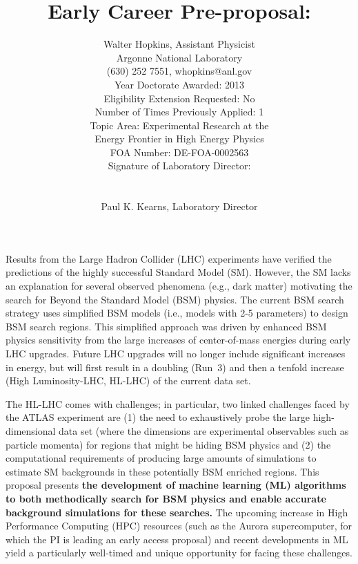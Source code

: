 \documentclass[letter, USenglish, 11pt, subfigure]{article}
\title{Early Career Pre-proposal: \\}
\author{Walter Hopkins, Assistant Physicist\\Argonne National Laboratory\\(630) 252 7551, whopkins@anl.gov\\Year Doctorate Awarded: 2013\\Eligibility Extension Requested: No\\Number of Times Previously Applied: 1\\ Topic Area: Experimental Research at the \\Energy Frontier in High Energy Physics\\
  FOA Number: DE-FOA-0002563\\Signature of Laboratory Director: \\ \\ \\Paul K. Kearns, Laboratory Director
}
\date{}
\begin{document}
\maketitle

Results from the Large Hadron Collider (LHC) experiments have verified the predictions of the highly successful Standard Model (SM). However, the SM  lacks an explanation for several observed phenomena (e.g., dark matter) motivating the search for Beyond the Standard Model (BSM) physics. The current BSM search strategy uses simplified BSM models (i.e., models with 2-5 parameters) to design BSM search regions. This simplified approach was driven by enhanced BSM physics sensitivity from the large increases of center-of-mass energies during early LHC upgrades. Future LHC upgrades will no longer include significant increases in energy, but will first result in a doubling (Run~3) and then a tenfold increase (High Luminosity-LHC, HL-LHC) of the current data set.

The HL-LHC comes with challenges; in particular, two linked challenges faced by the ATLAS experiment are (1) the need to exhaustively probe the large high-dimensional data set (where the dimensions are experimental observables such as particle momenta) for regions that might be hiding BSM physics and (2) the computational requirements of producing large amounts of simulations to estimate SM backgrounds in these potentially BSM enriched regions. This proposal presents {\bf the development of machine learning (ML) algorithms to both methodically search for BSM physics and enable accurate background simulations for these searches.} The upcoming increase in High Performance Computing (HPC) resources (such as the Aurora supercomputer, for which the PI is leading an early access proposal) and recent developments in ML yield a particularly well-timed and unique opportunity for facing these challenges.
\end{document}
